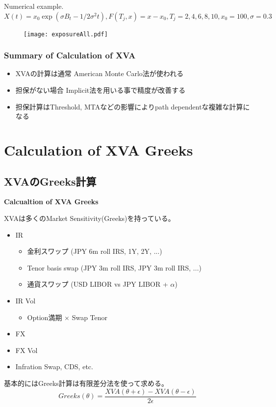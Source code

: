 \documentclass[driverfallback=dvipdfmx,cjk]{beamer}
\begin{document}
\begin{frame}
    Numerical example.
$X(t) = x_0 \exp(\sigma B_t - 1/2 \sigma^2 t), F(T_j, x) = x - x_0, T_j = 2, 4, 6, 8, 10, x_0=100, \sigma = 0.3$
    \begin{figure}
        \texttt{[image: exposureAll.pdf]}
    \end{figure}
\end{frame}

\begin{frame}\frametitle{Summary of Calculation of XVA}
\begin{itemize}
    \item XVAの計算は通常 American Monte Carlo法が使われる
    \item 担保がない場合 Implicit法を用いる事で精度が改善する
    \item 担保計算はThreshold, MTAなどの影響によりpath dependentな複雑な計算になる
\end{itemize}    
\end{frame}

\section{Calculation of XVA Greeks}
\subsection{XVAのGreeks計算}
\begin{frame}
    \textbf{Calcualtion of XVA Greeks}
\end{frame}

\begin{frame}
    XVAは多くのMarket Sensitivity(Greeks)を持っている。
    \begin{itemize}
        \item IR
            \begin{itemize}
                \item 金利スワップ (JPY 6m roll IRS, 1Y, 2Y, ...)
                \item Tenor basis swap (JPY 3m roll IRS, JPY 3m roll IRS, ...)
                \item 通貨スワップ (USD LIBOR vs JPY LIBOR + $\alpha$)
            \end{itemize}
        \item IR Vol
            \begin{itemize}
                \item Option満期 $\times$ Swap Tenor
            \end{itemize}
        \item FX 
        \item FX Vol
        \item Infration Swap, CDS, etc.
    \end{itemize}
    基本的にはGreeks計算は有限差分法を使って求める。
    $$Greeks(\theta) = \frac{XVA(\theta+ \epsilon) - XVA(\theta - \epsilon)}{2 \epsilon} $$
\end{frame}
\end{document}
